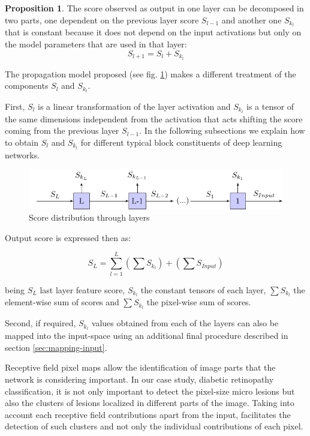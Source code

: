 \documentclass[review]{elsarticle}
\theoremstyle{definition} %
\newtheorem{proposition}{Proposition}%
\theoremstyle{remark}
\begin{document}
\begin{proposition}
	The score observed as output in one layer can be decomposed in two parts, one dependent on the previous layer score $S_{l-1}$ and another one $S_{k_l}$  that is constant because it does not depend on the input activations but only on the model parameters that are used in that layer:
	\begin{equation}
	S_{l+1} = S_{l} + S_{k_l}
	\end{equation}
\end{proposition}

The propagation model proposed (see fig. \ref{fig:score_map}) makes a different treatment of the components $S_l$ and $S_{k_l}$. 

First, $S_l$ is a linear transformation of the layer activation and $S_{k_l}$ is a tensor of the same dimensions independent from the activation that acts shifting the score coming from the previous layer $S_{l-1}$. In the following subsections we explain how to obtain $S_l$ and $S_{k_l}$ for different typical block constituents of deep learning networks.

\begin{figure}[h!]
	\centering
	\includegraphics{figures/score_map.pdf}
	\caption{Score distribution through layers}
	\label{fig:score_map}
\end{figure}

Output score is expressed then as:

\begin{equation}
S_L = \sum_{l=1}^L \left ( \sum S_{k_l} \right ) + \left ( \sum S_{Input} \right )
\end{equation}

being $S_L$ last layer feature score, $S_{k_l}$ the constant tensors of each layer, $\sum S_{k_l}$ the element-wise sum of scores and $\sum S_{k_l}$ the pixel-wise sum of scores.

Second, if required, $S_{k_l}$ values obtained from each of the layers can also be mapped into the input-space using an additional final procedure described in section \ref{sec:mapping-input}.

Receptive field pixel maps allow the identification of image parts that the network is considering important. In our case study, diabetic retinopathy classification, it is not only important to detect the pixel-size micro lesions but also the clusters of lesions localized in different parts of the image. Taking into account each receptive field contributions apart from the input, facilitates the detection of such clusters and not only the individual contributions of each pixel. 
\end{document}
